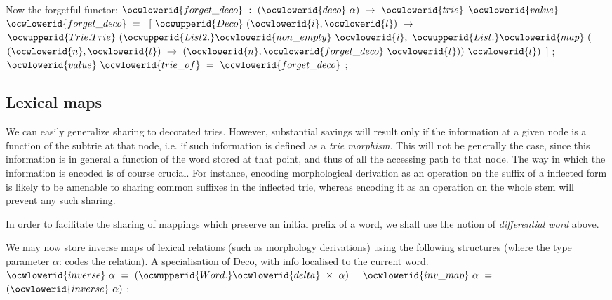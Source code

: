 \documentclass[12pt]{article}
\begin{document}
\ocwendcode{}\ocwindent{0.00em}
Now the forgetful functor: \ocwbegindcode{}$\ocwlowerid{forget\_deco}~:~(\ocwlowerid{deco}~\alpha{})~\rightarrow{}~\ocwlowerid{trie}$\ocwenddcode{} 
\ocweol
\label{../ML/deco.ml:5677}%
\medskip
\ocwbegincode{}\ocwindent{0.00em}
$\ocwlowerid{value}~$~$\ocwlowerid{forget\_deco}~=~$\ocweol
\ocwindent{1.00em}
$[~\ocwupperid{Deco}~(\ocwlowerid{i},\ocwlowerid{l})~\rightarrow{}~$\ocweol
\ocwindent{2.00em}
$\ocwupperid{Trie.Trie}~(\ocwupperid{List2.}\ocwlowerid{non\_empty}~\ocwlowerid{i},~\ocwupperid{List.}\ocwlowerid{map}~($~$(\ocwlowerid{n},\ocwlowerid{t})~\rightarrow{}~(\ocwlowerid{n},\ocwlowerid{forget\_deco}~\ocwlowerid{t}))~\ocwlowerid{l})$\ocweol
\ocwindent{1.00em}
$]$\ocweol
\ocwindent{0.00em}
;\ocweol
\ocwindent{0.00em}
$\ocwlowerid{value}~\ocwlowerid{trie\_of}~=~\ocwlowerid{forget\_deco}$\ocweol
\ocwindent{0.00em}
;\ocweol
\ocweol
\ocwendcode{}\subsection{Lexical maps}

We can easily generalize sharing to decorated tries. However,
substantial savings will result only if the information at a given node
is a function of the subtrie at that node, i.e. if such information is
defined as a {\sl trie morphism}. This will not be generally the case,
since this information is in general a function of the word stored at
that point, and thus of all the accessing path to that node. The way in which
the information is encoded is of course crucial. For instance, encoding
morphological derivation as an operation on the suffix of a inflected form
is likely to be amenable to sharing common suffixes in the inflected trie,
whereas encoding it as an operation on the whole stem will prevent any 
such sharing. 

In order to facilitate the sharing of mappings which preserve an initial
prefix of a word, we shall use the notion of {\sl differential word} above.

We may now store inverse maps of lexical relations (such as morphology
derivations) using the following structures 
(where the type parameter $\alpha$: codes the relation).
\label{../ML/lexmap.ml:0}%
A specialisation of Deco, with info localised to the current word.  
\ocweol
\label{../ML/lexmap.ml:745}%
\medskip
\ocwbegincode{}\ocwindent{0.00em}
~$\ocwlowerid{inverse}~\alpha{}~=~(\ocwupperid{Word.}\ocwlowerid{delta}~\times{}~\alpha{})~$\ocweol
\ocwindent{0.00em}
~$\ocwlowerid{inv\_map}~\alpha{}~=~$~$(\ocwlowerid{inverse}~\alpha{})$\ocweol
\ocwindent{0.00em}
;\medskip
\end{document}
